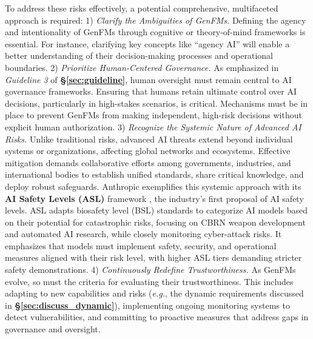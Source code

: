To address these risks effectively, a potential comprehensive, multifaceted approach is required: 1) \textit{Clarify the Ambiguities of GenFMs.} Defining the agency and intentionality of GenFMs through cognitive or theory-of-mind frameworks \cite{segerie2024ai} is essential. For instance, clarifying key concepts like ``agency AI'' will enable a better understanding of their decision-making processes and operational boundaries. 
2) \textit{Prioritize Human-Centered Governance.} As emphasized in \textit{Guideline 3} of \textbf{\S\ref{sec:guideline}}, human oversight must remain central to AI governance frameworks. Ensuring that humans retain ultimate control over AI decisions, particularly in high-stakes scenarios, is critical. Mechanisms must be in place to prevent GenFMs from making independent, high-risk decisions without explicit human authorization. 
3) \textit{Recognize the Systemic Nature of Advanced AI Risks.} Unlike traditional risks, advanced AI threats extend beyond individual systems or organizations, affecting global networks and ecosystems. Effective mitigation demands collaborative efforts among governments, industries, and international bodies to establish unified standards, share critical knowledge, and deploy robust safeguards. Anthropic exemplifies this systemic approach with its \textbf{AI Safety Levels (ASL)} framework \cite{Anthropic-ASL}, the industry's first proposal of AI safety levels. ASL adapts biosafety level (BSL) standards to categorize AI models based on their potential for catastrophic risks, focusing on CBRN weapon development and automated AI research, while closely monitoring cyber-attack risks. It emphasizes that models must implement safety, security, and operational measures aligned with their risk level, with higher ASL tiers demanding stricter safety demonstrations.
4) \textit{Continuously Redefine Trustworthiness.} As GenFMs evolve, so must the criteria for evaluating their trustworthiness. This includes adapting to new capabilities and risks (\emph{e.g.}, the dynamic requirements discussed in \textbf{\S\ref{sec:discuss_dynamic}}), implementing ongoing monitoring systems to detect vulnerabilities, and committing to proactive measures that address gaps in governance and oversight. 
